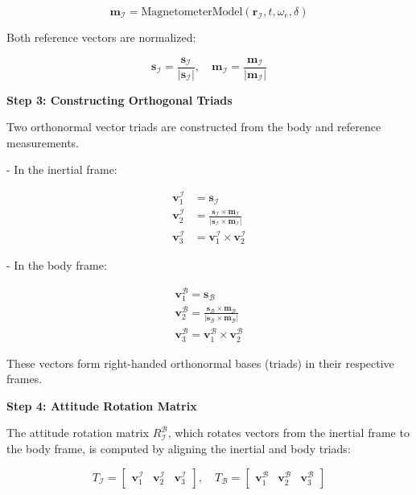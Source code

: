 \begin{equation}
   \mathbf{m}_{\mathcal{I}} = \text{MagnetometerModel}(\mathbf{r}_{\mathcal{I}}, t, \omega_e, \delta)
\end{equation}

Both reference vectors are normalized:

\begin{equation}
   \mathbf{s}_{\mathcal{I}} = \frac{\mathbf{s}_{\mathcal{I}}}{|\mathbf{s}_{\mathcal{I}}|}, \quad
   \mathbf{m}_{\mathcal{I}} = \frac{\mathbf{m}_{\mathcal{I}}}{|\mathbf{m}_{\mathcal{I}}|}
\end{equation}

\textbf{Step 3: Constructing Orthogonal Triads}

Two orthonormal vector triads are constructed from the body and reference measurements.

- In the inertial frame:

\begin{align}
    \mathbf{v}_1^{\mathcal{I}} &= \mathbf{s}_{\mathcal{I}} \\
    \mathbf{v}_2^{\mathcal{I}} &= \frac{\mathbf{s}_{\mathcal{I}} \times \mathbf{m}_{\mathcal{I}}}{|\mathbf{s}_{\mathcal{I}} \times \mathbf{m}_{\mathcal{I}}|} \\
    \mathbf{v}_3^{\mathcal{I}} &= \mathbf{v}_1^{\mathcal{I}} \times \mathbf{v}_2^{\mathcal{I}}
\end{align}

- In the body frame:

\begin{align}
    \mathbf{v}_1^{\mathcal{B}} = \mathbf{s}_{\mathcal{B}} \\
    \mathbf{v}_2^{\mathcal{B}} = \frac{\mathbf{s}_{\mathcal{B}} \times \mathbf{m}_{\mathcal{B}}}{|\mathbf{s}_{\mathcal{B}} \times \mathbf{m}_{\mathcal{B}}|} \\
    \mathbf{v}_3^{\mathcal{B}} = \mathbf{v}_1^{\mathcal{B}} \times \mathbf{v}_2^{\mathcal{B}}
\end{align}

These vectors form right-handed orthonormal bases (triads) in their respective frames.

\textbf{Step 4: Attitude Rotation Matrix}

The attitude rotation matrix $R_{\mathcal{I}}^{\mathcal{B}}$, which rotates vectors from the inertial frame to the body frame, is computed by aligning the inertial and body triads:

\begin{equation}
    T_{\mathcal{I}} = \begin{bmatrix} \mathbf{v}_1^{\mathcal{I}} & \mathbf{v}_2^{\mathcal{I}} & \mathbf{v}_3^{\mathcal{I}} \end{bmatrix}, \quad
    T_{\mathcal{B}} = \begin{bmatrix} \mathbf{v}_1^{\mathcal{B}} & \mathbf{v}_2^{\mathcal{B}} & \mathbf{v}_3^{\mathcal{B}} \end{bmatrix}
\end{equation}

